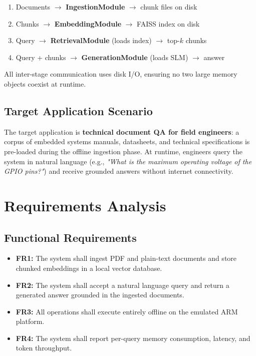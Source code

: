 \documentclass[10pt,twocolumn]{article}
\begin{document}
\begin{enumerate}[leftmargin=*,itemsep=2pt,label=\arabic*.]
  \item Documents $\rightarrow$ \textbf{IngestionModule} $\rightarrow$ chunk files on disk
  \item Chunks $\rightarrow$ \textbf{EmbeddingModule} $\rightarrow$ FAISS index on disk
  \item Query $\rightarrow$ \textbf{RetrievalModule} (loads index) $\rightarrow$ top-$k$ chunks
  \item Query + chunks $\rightarrow$ \textbf{GenerationModule} (loads SLM) $\rightarrow$ answer
\end{enumerate}

All inter-stage communication uses disk I/O, ensuring no two large memory objects coexist at runtime.

\subsection{Target Application Scenario}

The target application is \textbf{technical document QA for field engineers}: a corpus of embedded systems manuals, datasheets, and technical specifications is pre-loaded during the offline ingestion phase. At runtime, engineers query the system in natural language (e.g., \textit{"What is the maximum operating voltage of the GPIO pins?"}) and receive grounded answers without internet connectivity.

\section{Requirements Analysis}
\label{sec:requirements}

\subsection{Functional Requirements}

\begin{itemize}[leftmargin=*,itemsep=2pt]
  \item \textbf{FR1:} The system shall ingest PDF and plain-text documents and store chunked embeddings in a local vector database.
  \item \textbf{FR2:} The system shall accept a natural language query and return a generated answer grounded in the ingested documents.
  \item \textbf{FR3:} All operations shall execute entirely offline on the emulated ARM platform.
  \item \textbf{FR4:} The system shall report per-query memory consumption, latency, and token throughput.
\end{itemize}
\end{document}
